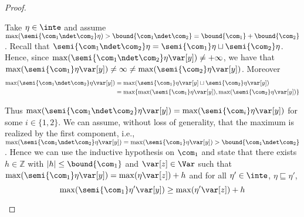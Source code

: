 \begin{proof}
\begin{inductive}
    
    
    
    Take \(\eta \in \inte\) and assume
    \(\max(\semi{\com_1 \ndet \com_2}\eta) > \bound{\com_1 \ndet \com_2}
    = \bound{\com_1} + \bound{\com_2}\).  Recall that
    \(\semi{\com_1 \ndet \com_2} \eta = \semi{\com_1}\eta \sqcup
    \semi{\com_2}\eta\).
    Hence, since
    \(\max(\semi{\com_1 \ndet \com_2} \eta \var[y]) \neq +\infty\), we
    have that
    \(\max(\semi{\com_1} \eta \var[y]) \neq \infty \neq
    \max(\semi{\com_2}\eta \var[y])\).  Moreover
    \begin{align*}
      \max(\semi{\com_1 \ndet \com_2}\eta \var[y])& =  \max(\semi{\com_1}\eta \var[y] \sqcup \semi{\com_2}\eta \var[y]) \\ 
                                                  & = \max \{ \max(\semi{\com_1}\eta \var[y]), \max(\semi{\com_2}\eta \var[y])\} %
    \end{align*}

    Thus
    \(\max(\semi{\com_1 \ndet \com_2}\eta \var[y]) =
    \max(\semi{\com_i}\eta \var[y])\) for some \(i \in \{1,2\}\). We can
    assume, without loss of generality, that the maximum is realized by
    the first component, i.e.,
    \(\max(\semi{\com_1 \ndet \com_2}\eta \var[y]) =
    \max(\semi{\com_1}\eta \var[y]) > \bound{\com_1 \ndet
      \com_2}\). Hence we can use the inductive hypothesis on \(\com_1\)
    and state that there exists \(h \in \mathbb{Z}\) with
    \(|h| \leq \bound{\com_1}\) and \(\var[z] \in \Var\) such that
    \(\max(\semi{\com_1}\eta \var[y]) = \max(\eta \var[z]) + h\) and for
    all \(\eta' \in \inte\), \(\eta \sqsubseteq \eta'\),
    \[
      \max(\semi{\com_1}\eta' \var[y]) \geq \max(\eta' \var[z]) + h
    \]


\end{inductive}
\end{proof}
